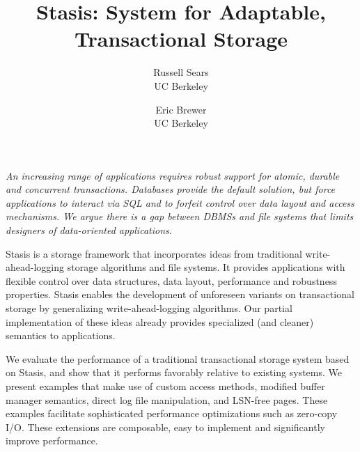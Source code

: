 \documentclass[letterpaper,twocolumn,10pt]{article}
\newcommand{\yad}{Stasis\xspace}
\begin{document}
\date{}


\title{\Large \bf \yad: System for Adaptable, Transactional Storage}

\author{
{\rm Russell Sears}\\
UC Berkeley
\and
{\rm Eric Brewer}\\
UC Berkeley
} %

\maketitle




{\em An increasing range of applications requires robust support for atomic, durable and concurrent
transactions.  Databases provide the default solution, but force
applications to interact via SQL and to forfeit control over data
layout and access mechanisms.  We argue there is a gap between DBMSs and file systems that limits designers of data-oriented applications.

\yad is a storage framework that incorporates ideas from traditional
write-ahead-logging storage algorithms and file systems.
It provides applications with flexible control over data structures, data layout, performance and robustness properties.
\yad enables the development of
unforeseen variants on transactional storage by generalizing
write-ahead-logging algorithms.  Our partial implementation of these
ideas already provides specialized (and cleaner) semantics to applications.

We evaluate the performance of a traditional transactional storage
system based on \yad, and show that it performs favorably relative to existing
systems.  We present examples that make use of custom access methods, modified
buffer manager semantics, direct log file manipulation, and LSN-free
pages.  These examples facilitate sophisticated performance 
optimizations such as zero-copy I/O.  These extensions are composable,
easy to implement and significantly improve performance.

}
\end{document}
